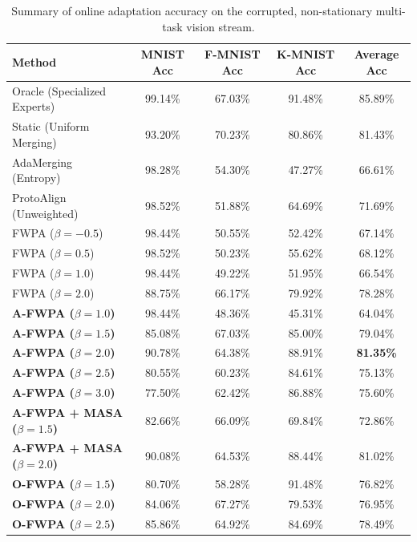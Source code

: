\documentclass{article}
\theoremstyle{plain}
\theoremstyle{definition}
\theoremstyle{remark}
\begin{document}
\begin{table}[t]
\caption{Summary of online adaptation accuracy on the corrupted, non-stationary multi-task vision stream.}
\label{tab:results}
\vskip 0.15in
\begin{center}
\begin{small}
\begin{tabular}{lcccc}
\toprule
\textbf{Method} & \textbf{MNIST Acc} & \textbf{F-MNIST Acc} & \textbf{K-MNIST Acc} & \textbf{Average Acc} \\
\midrule
Oracle (Specialized Experts) & 99.14\% & 67.03\% & 91.48\% & 85.89\% \\
\midrule
Static (Uniform Merging) & 93.20\% & 70.23\% & 80.86\% & 81.43\% \\
AdaMerging (Entropy) & 98.28\% & 54.30\% & 47.27\% & 66.61\% \\
ProtoAlign (Unweighted) & 98.52\% & 51.88\% & 64.69\% & 71.69\% \\
\midrule
FWPA ($\beta = -0.5$) & 98.44\% & 50.55\% & 52.42\% & 67.14\% \\
FWPA ($\beta = 0.5$) & 98.52\% & 50.23\% & 55.62\% & 68.12\% \\
FWPA ($\beta = 1.0$) & 98.44\% & 49.22\% & 51.95\% & 66.54\% \\
FWPA ($\beta = 2.0$) & 88.75\% & 66.17\% & 79.92\% & 78.28\% \\
\midrule
\textbf{A-FWPA ($\beta = 1.0$)} & 98.44\% & 48.36\% & 45.31\% & 64.04\% \\
\textbf{A-FWPA ($\beta = 1.5$)} & 85.08\% & 67.03\% & 85.00\% & 79.04\% \\
\textbf{A-FWPA ($\beta = \mathbf{2.0}$)} & 90.78\% & 64.38\% & 88.91\% & \textbf{81.35\%} \\
\textbf{A-FWPA ($\beta = 2.5$)} & 80.55\% & 60.23\% & 84.61\% & 75.13\% \\
\textbf{A-FWPA ($\beta = 3.0$)} & 77.50\% & 62.42\% & 86.88\% & 75.60\% \\
\midrule
\textbf{A-FWPA + MASA ($\beta = 1.5$)} & 82.66\% & 66.09\% & 69.84\% & 72.86\% \\
\textbf{A-FWPA + MASA ($\beta = \mathbf{2.0}$)} & 90.08\% & 64.53\% & 88.44\% & 81.02\% \\
\midrule
\textbf{O-FWPA ($\beta = 1.5$)} & 80.70\% & 58.28\% & 91.48\% & 76.82\% \\
\textbf{O-FWPA ($\beta = 2.0$)} & 84.06\% & 67.27\% & 79.53\% & 76.95\% \\
\textbf{O-FWPA ($\beta = \mathbf{2.5}$)} & 85.86\% & 64.92\% & 84.69\% & 78.49\% \\
\bottomrule
\end{tabular}
\end{small}
\end{center}
\vskip -0.1in
\end{table}
\end{document}
